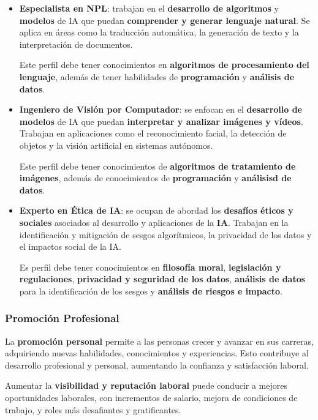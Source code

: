 \begin{itemize}
	Es perfil tiene que tener conocimientos de \textbf{programación} y \textbf{algoritmos de ML}, además de una gran \textbf{capacidad de trabajo en equipo}.
	
	\item \textbf{Especialista en NPL}: trabajan en el \textbf{desarrollo de algoritmos} y \textbf{modelos} de IA que puedan \textbf{comprender y generar lenguaje natural}. Se aplica en áreas como la traducción automática, la generación de texto y la interpretación de documentos.
	
	Este perfil debe tener conocimientos en \textbf{algoritmos de procesamiento del lenguaje}, además de tener habilidades de \textbf{programación} y \textbf{análisis de datos}.
	
	\item \textbf{Ingeniero de Visión por Computador}: se enfocan en el \textbf{desarrollo de modelos} de IA que puedan \textbf{interpretar y analizar imágenes y vídeos}. Trabajan en aplicaciones como el reconocimiento facial, la detección de objetos y la visión artificial en sistemas autónomos.
	
	Este perfil debe tener conocimientos de \textbf{algoritmos de tratamiento de imágenes}, además de conocimientos de \textbf{programación} y \textbf{análisisd de datos}. 
	
	\item \textbf{Experto en Ética de IA}: se ocupan de abordad los \textbf{desafíos éticos y sociales} asociados al desarrollo y aplicaciones de la \textbf{IA}. Trabajan en la identificación y mitigación de sesgos algorítmicos, la privacidad de los datos y el impactos social de la IA. 
	
	Es perfil debe tener conocimientos en \textbf{filosofía moral}, \textbf{legislación y regulaciones}, \textbf{privacidad y seguridad de los datos}, \textbf{análisis de datos} para la identificación de los sesgos y \textbf{análisis de riesgos e impacto}.
\end{itemize} 


\subsubsection{Promoción Profesional}
La \textbf{promoción personal} permite a las personas crecer y avanzar en sus carreras, adquiriendo nuevas habilidades, conocimientos y experiencias. Esto contribuye al desarrollo profesional y personal, aumentando la confianza y satisfacción laboral.

Aumentar la \textbf{visibilidad y reputación laboral} puede conducir a mejores oportunidades laborales, con incrementos de salario, mejora de condiciones de trabajo, y roles más desafiantes y gratificantes. 

